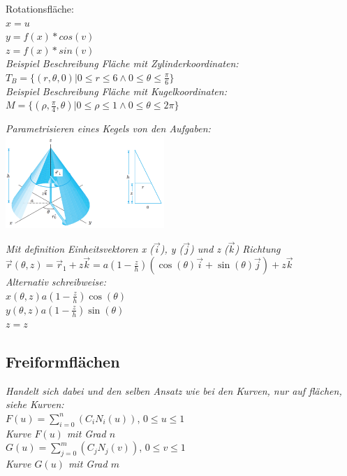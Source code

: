 Rotationsfläche:\\
\textit{$x=u$}\\
\textit{$y = f(x) * cos(v)$}\\
\textit{$z = f(x) * sin(v)$}\\

\textit{Beispiel Beschreibung Fläche mit Zylinderkoordinaten:}\\
$T_B = \{(r, \theta, 0)|0 \leq r \leq 6 \wedge 0 \leq \theta \leq \frac{\pi}{6}\}$\\

\textit{Beispiel Beschreibung Fläche mit Kugelkoordinaten:}\\
$M = \{(\rho, \frac{\pi}{4}, \theta)|0 \leq \rho \leq 1 \wedge 0 \leq \theta \leq 2\pi\}$

\textit{Parametrisieren eines Kegels von den Aufgaben:}
\includegraphics[width=0.45\textwidth]{assets/area-parameterize-example.png}

\textit{Mit definition Einheitsvektoren x ($\vec{i}$), y ($\vec{j}$) und z ($\vec{k}$) Richtung}\\
$\vec{r}(\theta, z) = \vec{r}_1 + z\vec{k} =
a(1-\frac{z}{h}) (\cos(\theta)\vec{i} + \sin(\theta)\vec{j}) + z \vec{k}$\\

\textit{Alternativ schreibweise:} \\
$x(\theta,z) a(1-\frac{z}{h}) \cos (\theta)$ \\
$y(\theta,z) a(1-\frac{z}{h}) \sin (\theta)$ \\
$z=z$

\subsection{Freiformflächen}

\textit{Handelt sich dabei und den selben Ansatz wie bei den Kurven,
nur auf flächen, siehe Kurven:}\\

$F(u) = \displaystyle \sum^n_{i=0}(C_i N_i (u))$, $0 \leq u \leq 1$\\
\textit{Kurve $F(u)$ mit Grad $n$}\\
$G(u) = \displaystyle \sum^m_{j=0}(C_j N_j (v))$, $0 \leq v \leq 1$\\
\textit{Kurve $G(u)$ mit Grad $m$}\\

